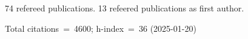 74 refereed publications. 13 refeered publications as first author.

Total citations~=~4600; h-index~=~36 (2025-01-20)